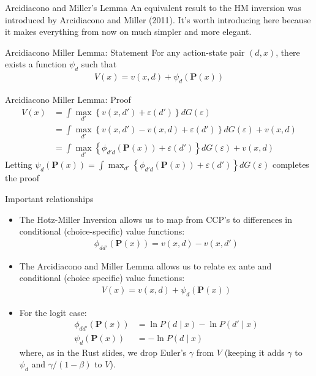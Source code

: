 \documentclass[aspectratio=169,11pt]{beamer}
\begin{document}
\begin{frame}{Arcidiacono and Miller's Lemma}
An equivalent result to the HM inversion was introduced by Arcidiacono and Miller (2011).
It's worth introducing here because it makes everything from now on much simpler
and more elegant.
\begin{block}{Arcidiacono Miller Lemma: Statement}
For any action-state pair $\left(d,x\right)$, there exists a function
$\psi_d$ such that
\begin{align*}
V\left(x\right)=v(x,d)+\psi_{d}\left(\symbf{P}\left(x\right)\right)
\end{align*}
\end{block}
\end{frame}

\begin{frame}{Arcidiacono Miller Lemma: Proof}
\begin{align*}
V\left(x\right) &=  \int\max_{d'}\left\{ v(x,d')+\varepsilon(d')\right\} dG\left(\varepsilon\right)\\
 &= \int\max_{d'}\left\{ v(x,d')-v(x,d)+\varepsilon(d')\right\} dG\left(\varepsilon\right)+v(x,d)\\
 &=  \int\max_{d'}\left\{ \phi_{d'd}\left(\symbf{P}\left(x\right)\right)+\varepsilon(d')\right\} dG\left(\varepsilon\right)+v(x,d)
\end{align*}
Letting $\psi_{d}\left(\symbf{P}\left(x\right)\right)=\int\max_{d'}\left\{ \phi_{d'd}\left(\symbf{P}\left(x\right)\right)+\varepsilon(d')\right\} dG\left(\varepsilon\right)$ completes the proof
\end{frame}

\begin{frame}{Important relationships}
\small
\begin{itemize}
\item The Hotz-Miller Inversion allows us to map from CCP's to differences
in conditional (choice-specific) value functions:
\begin{align*}
\phi_{dd'}\left(\symbf{P}\left(x\right)\right)=v(x,d)-v(x,d')
\end{align*}
\item The Arcidiacono and Miller Lemma allows us to relate ex ante and conditional (choice specific)
value functions:
\begin{align*}
V\left(x\right)=v(x,d)+\psi_{d}\left(\symbf{P}\left(x\right)\right)
\end{align*}
\item For the logit case:
\begin{align*}
\phi_{dd'}\left(\symbf{P}\left(x\right)\right) & = \ln P(d \mid x)-\ln P(d' \mid x)\\
\psi_{d}\left(\symbf{P}\left(x\right)\right) & =  -\ln P(d \mid x)
\end{align*}
where, as in the Rust slides, we drop Euler's $\gamma$ from $V$ (keeping it adds $\gamma$ to $\psi_d$ and $\gamma/(1-\beta)$ to $V$).
\end{itemize}
\end{frame}
\end{document}
